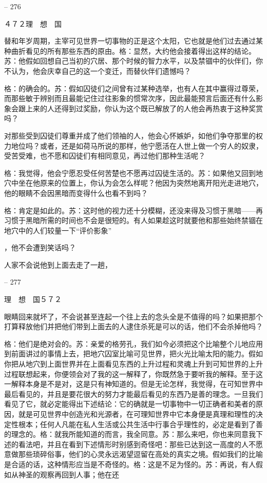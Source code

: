 \documentclass[11pt,oneside]{book}
\begin{document}
\begin{common-format}
    

-- 276

    ４７２理　想　国

    替和年岁周期，主宰可见世界一切事物的正是这个太阳，它也就是他们过去通过某种曲折看见的所有那些东西的原由。格：显然，大约他会接着得出这样的结论。苏：他假如回想自己当初的穴居、那个时候的智力水平，以及禁锢中的伙伴们，你不认为，他会庆幸自己的这一个变迁，而替伙伴们遗憾吗？

    格：的确会的。苏：假如囚徒们之间曾有过某种选举，也有人在其中赢得过尊荣，而那些敏于辨别而且最能记住过往影象的惯常次序，因此最能预言后面还有什么影象会跟上来的人还得到过奖励，你认为这个既已解放了的人他会再热衷于这种奖赏吗？

    对那些受到囚徒们尊重并成了他们领袖的人，他会心怀嫉妒，如他们争夺那里的权力地位吗？或者，还是如荷马所说的那样，他宁愿活在人世上做一个穷人的奴隶，受苦受难，也不愿和囚徒们有相同意见，再过他们那种生活呢？

    格：我觉得，他会宁愿忍受任何苦楚也不愿再过囚徒生活的。苏：如果他又回到地穴中坐在他原来的位置上，你认为会怎么样呢？他因为突然地离开阳光走进地穴，他的眼睛不会因黑暗而变得什么也看不到吗？

    格：肯定是如此的。苏：这时他的视力还十分模糊，还没来得及习惯于黑暗——再习惯于黑暗所需的时间也不会是很短的。有人如果趁这时就要他和那些始终禁锢在地穴中的人们较量一下“评价影象”

    ，他不会遭到笑话吗？

    人家不会说他到上面去走了一趟，

    

-- 277

    理　想　国５７２

    眼睛回来就坏了，不会说甚至连起一个往上去的念头全是不值得的吗？如果把那个打算释放他们并把他们带到上面去的人逮住杀死是可以的话，他们不会杀掉他吗？

    格：他们是绝对会的。苏：亲爱的格劳孔，我们如今必须把这个比喻整个儿地应用到前面讲过的事情上去，把地穴囚室比喻可见世界，把火光比喻太阳的能力。假如你把从地穴到上面世界并在上面看见东西的上升过程和灵魂上升到可知世界的上升过程联想起来，你便领会对了我的这一解释了，你既然急于要听我的解释。至于这一解释本身是不是对，这是只有神知道的。但是无论怎样，我觉得，在可知世界中最后看见的，并且是要花很大的努力才能最后看见的东西乃是善的理念。一旦我们看见了它，就必定能得出下述结论：它的确就是一切事物中一切正确者和美者的原因，就是可见世界中创造光和光源者，在可理知世界中它本身便是真理和理性的决定性根本；任何人凡能在私人生活或公共生活中行事合乎理性的，必定是看到了善的理念的。格：就我所能知道的而言，我全同意。苏：那么来吧，你也来同意我下述的看法吧，并且在看到下述情形时别感到奇怪吧：那些已达到这一高度的人不愿意做那些琐碎俗事，他们的心灵永远渴望逗留在高处的真实之境。假如我们的比喻是合适的话，这种情形应当是不奇怪的。格：这是不足为怪的。苏：再说，有人假如从神圣的观察再回到人事；他在还


\end{common-format}
\end{document}
